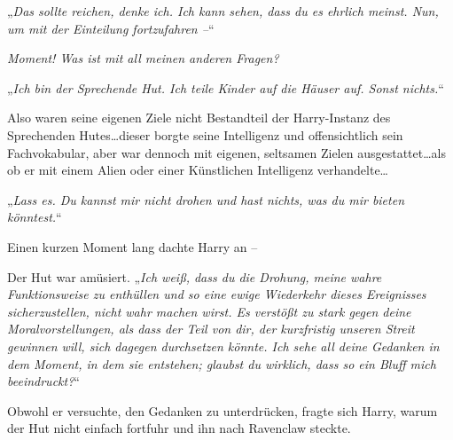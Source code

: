 „\emph{Das sollte reichen, denke ich. Ich kann sehen, dass du es ehrlich meinst. Nun, um mit der Einteilung fortzufahren –}“

\emph{Moment! Was ist mit all meinen anderen Fragen?}

„\emph{Ich bin der Sprechende Hut. Ich teile Kinder auf die Häuser auf. Sonst nichts.}“

Also waren seine eigenen Ziele nicht Bestandteil der Harry-Instanz des Sprechenden Hutes…dieser borgte seine Intelligenz und offensichtlich sein Fachvokabular, aber war dennoch mit eigenen, seltsamen Zielen ausgestattet…als ob er mit einem Alien oder einer Künstlichen Intelligenz verhandelte…

„\emph{Lass es. Du kannst mir nicht drohen und hast nichts, was du mir bieten könntest.}“

Einen kurzen Moment lang dachte Harry an –

Der Hut war amüsiert. „\emph{Ich weiß, dass du die Drohung, meine wahre Funktionsweise zu enthüllen und so eine ewige Wiederkehr dieses Ereignisses sicherzustellen, nicht wahr machen wirst. Es verstößt zu stark gegen deine Moralvorstellungen, als dass der Teil von dir, der kurzfristig unseren Streit gewinnen will, sich dagegen durchsetzen könnte. Ich sehe all deine Gedanken in dem Moment, in dem sie entstehen; glaubst du wirklich, dass so ein Bluff mich beeindruckt?}“

Obwohl er versuchte, den Gedanken zu unterdrücken, fragte sich Harry, warum der Hut nicht einfach fortfuhr und ihn nach Ravenclaw steckte.

